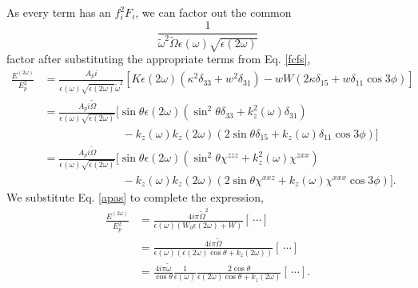 \documentclass[10pt]{article}
\begin{document}
As every term has an $f^{2}_{i}F_{i}$, we can factor out the common
\begin{equation*}
\frac{1}
{\tilde{\omega}^2\tilde{\Omega}\epsilon(\omega)\sqrt{\epsilon(2\omega)}}
\end{equation*}
factor after substituting the appropriate terms from Eq. \eqref{fcfs},
\begin{equation*}
\begin{split}
\frac{E^{(2\omega)}}{E^{2}_{p}}
&= \frac{A_{p}i}{\epsilon(\omega)\sqrt{\epsilon(2\omega)}\tilde{\omega}^2}
   \left[
   K\epsilon(2\omega)(\kappa^{2}\delta_{33} + w^{2}\delta_{31})
   - wW(2\kappa\delta_{15} + w\delta_{11}\cos3\phi)
   \right]\\
&= \frac{A_{p}i\tilde{\Omega}}{\epsilon(\omega)\sqrt{\epsilon(2\omega)}}
   \big[
   \sin\theta\epsilon(2\omega)(
   \sin^{2}\theta\delta_{33} + k^{2}_{z}(\omega)\delta_{31})\\
   &\qquad\qquad\qquad\quad- k_{z}(\omega)k_{z}(2\omega)(2\sin\theta\delta_{15}
   + k_{z}(\omega)\delta_{11}\cos3\phi)
   \big]\\
&= \frac{A_{p}i\tilde{\Omega}}{\epsilon(\omega)\sqrt{\epsilon(2\omega)}}
   \big[
   \sin\theta\epsilon(2\omega)(
   \sin^{2}\theta\chi^{zzz} + k^{2}_{z}(\omega)\chi^{zxx})\\
   &\qquad\qquad\qquad\quad- k_{z}(\omega)k_{z}(2\omega)(2\sin\theta\chi^{xxz}
   + k_{z}(\omega)\chi^{xxx}\cos3\phi)
   \big].
\end{split}
\end{equation*}
We substitute Eq. \eqref{apas} to complete the expression,
\begin{equation*}
\begin{split}
\frac{E^{(2\omega)}}{E^{2}_{p}}
&= \frac{4i\pi\tilde{\Omega}^{2}}{\epsilon(\omega)(W_{0}\epsilon(2\omega) + W)}
   [\,\cdots]\\
&= \frac{4i\pi\tilde{\Omega}}
   {\epsilon(\omega)(\epsilon(2\omega)\cos\theta + k_{z}(2\omega))}
   [\,\cdots]\\
&= \frac{4i\pi\tilde{\omega}}{\cos\theta}
   \frac{1}{\epsilon(\omega)}
   \frac{2\cos\theta}{\epsilon(2\omega)\cos\theta + k_{z}(2\omega)}[\,\cdots].
\end{split}
\end{equation*}
\end{document}
